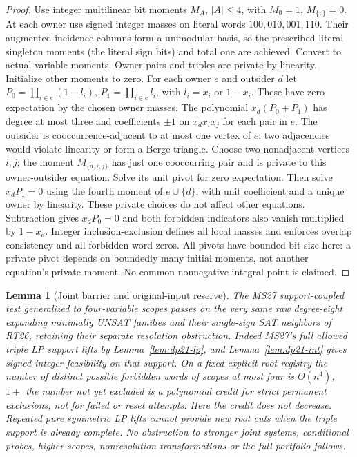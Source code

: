 \documentclass[11pt]{article}
\newtheorem{lemma}[theorem]{Lemma}
\begin{document}
\begin{proof}
Use integer multilinear bit moments $M_A$, $|A|\le4$, with $M_\emptyset=1$, $M_{\{v\}}=0$. At each owner use signed integer masses on literal words $100,010,001,110$. Their augmented incidence columns form a unimodular basis, so the prescribed literal singleton moments (the literal sign bits) and total one are achieved. Convert to actual variable moments. Owner pairs and triples are private by linearity. Initialize other moments to zero. For each owner $e$ and outsider $d$ let $P_0=\prod_{i\in e}(1-l_i)$, $P_1=\prod_{i\in e}l_i$, with $l_i=x_i$ or $1-x_i$. These have zero expectation by the chosen owner masses. The polynomial $x_d(P_0+P_1)$ has degree at most three and coefficients $\pm1$ on $x_dx_ix_j$ for each pair in $e$. The outsider is cooccurrence-adjacent to at most one vertex of $e$: two adjacencies would violate linearity or form a Berge triangle. Choose two nonadjacent vertices $i,j$; the moment $M_{\{d,i,j\}}$ has just one cooccurring pair and is private to this owner-outsider equation. Solve its unit pivot for zero expectation. Then solve $x_dP_1=0$ using the fourth moment of $e\cup\{d\}$, with unit coefficient and a unique owner by linearity. These private choices do not affect other equations. Subtraction gives $x_dP_0=0$ and both forbidden indicators also vanish multiplied by $1-x_d$. Integer inclusion-exclusion defines all local masses and enforces overlap consistency and all forbidden-word zeros. All pivots have bounded bit size here: a private pivot depends on boundedly many initial moments, not another equation's private moment. No common nonnegative integral point is claimed.
\end{proof}
\begin{lemma}[Joint barrier and original-input reserve]\label{lem:dp21-reserve}
The MS27 support-coupled test generalized to four-variable scopes passes on the very same raw degree-eight expanding minimally UNSAT families and their single-sign SAT neighbors of RT26, retaining their separate resolution obstruction. Indeed MS27's full allowed triple LP support lifts by Lemma~\ref{lem:dp21-lp}, and Lemma~\ref{lem:dp21-int} gives signed integer feasibility on that support. On a fixed explicit root registry the number of distinct possible forbidden words of scopes at most four is $O(n^4)$; $1+$ the number not yet excluded is a polynomial credit for strict permanent exclusions, not for failed or reset attempts. Here the credit does not decrease. Repeated pure symmetric LP lifts cannot provide new root cuts when the triple support is already complete. No obstruction to stronger joint systems, conditional probes, higher scopes, nonresolution transformations or the full portfolio follows.
\end{lemma}
\end{document}
